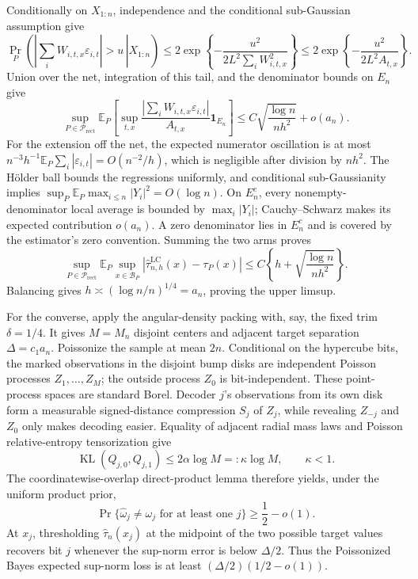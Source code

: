 Conditionally on \(X_{1:n}\), independence and the conditional sub-Gaussian assumption give
\[
 \Pr_P\!\left(\left.\left|\sum_iW_{i,t,x}\varepsilon_{i,t}\right|>u\,\right|X_{1:n}\right)
 \leq2\exp\!\left\{-\frac{u^2}{2L^2\sum_iW_{i,t,x}^2}\right\}
 \leq2\exp\!\left\{-\frac{u^2}{2L^2A_{t,x}}\right\}.
\]
Union over the net, integration of this tail, and the denominator bounds on \(E_n\) give
\[
 \sup_{P\in\mathcal P_{\mathrm{rect}}}
 \mathbb E_P\!\left[
 \sup_{t,x}\frac{|\sum_iW_{i,t,x}\varepsilon_{i,t}|}{A_{t,x}}
 \mathbf1_{E_n}\right]
 \leq C\sqrt{\frac{\log n}{nh^2}}+o(a_n).
\]
For the extension off the net, the expected numerator oscillation is at most
\(n^{-3}h^{-1}\mathbb E_P\sum_i|\varepsilon_{i,t}|=O(n^{-2}/h)\), which is negligible after division by \(nh^2\).  The H\"older ball bounds the regressions uniformly, and conditional sub-Gaussianity implies
\(\sup_P\mathbb E_P\max_{i\leq n}|Y_i|^2=O(\log n)\).  On \(E_n^c\), every nonempty-denominator local average is bounded by \(\max_i|Y_i|\); Cauchy--Schwarz makes its expected contribution \(o(a_n)\).  A zero denominator lies in \(E_n^c\) and is covered by the estimator's zero convention.  Summing the two arms proves
\[
 \sup_{P\in\mathcal P_{\mathrm{rect}}}
 \mathbb E_P\sup_{x\in\mathcal B_P}
 |\widehat\tau^{\mathrm{LC}}_{n,h}(x)-\tau_P(x)|
 \leq C\left\{h+\sqrt{\frac{\log n}{nh^2}}\right\}.
\]
Balancing gives \(h\asymp(\log n/n)^{1/4}=a_n\), proving the upper limsup.

For the converse, apply the angular-density packing with, say, the fixed trim \(\delta=1/4\).  It gives \(M=M_n\) disjoint centers and adjacent target separation \(\Delta=c_1a_n\).  Poissonize the sample at mean \(2n\).  Conditional on the hypercube bits, the marked observations in the disjoint bump disks are independent Poisson processes \(Z_1,\ldots,Z_M\); the outside process \(Z_0\) is bit-independent.  These point-process spaces are standard Borel.  Decoder \(j\)'s observations from its own disk form a measurable signed-distance compression \(S_j\) of \(Z_j\), while revealing \(Z_{-j}\) and \(Z_0\) only makes decoding easier.  Equality of adjacent radial mass laws and Poisson relative-entropy tensorization give
\[
 \operatorname{KL}(Q_{j,0},Q_{j,1})
 \leq2\alpha\log M=:\kappa\log M,
 \qquad \kappa<1.
\]
The coordinatewise-overlap direct-product lemma therefore yields, under the uniform product prior,
\[
 \Pr\{\widehat\omega_j\neq\omega_j\text{ for at least one }j\}
 \geq\frac12-o(1).
\]
At \(x_j\), thresholding \(\widehat\tau_n(x_j)\) at the midpoint of the two possible target values recovers bit \(j\) whenever the sup-norm error is below \(\Delta/2\).  Thus the Poissonized Bayes expected sup-norm loss is at least
\((\Delta/2)(1/2-o(1))\).


